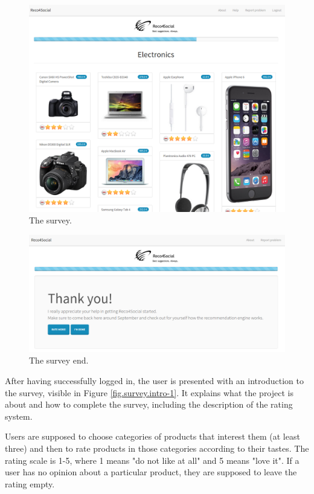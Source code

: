 \documentclass[12pt]{report}
\begin{document}
\begin{figure}[!t]
\centering
\includegraphics[width=\textwidth]{survey2.png} 
\caption[The survey.]{The survey.}
\label{fig.survey}
\end{figure}

\begin{figure}[!t]
\centering
\includegraphics[width=\textwidth]{survey_end.png} 
\caption[The survey end.]{The survey end.}
\label{fig.survey.end}
\end{figure}

After having successfully logged in, the user is presented with an introduction to the survey, visible in Figure \ref{fig.survey.intro-1}. It explains what the project is about and how to complete the survey, including the description of the rating system.

Users are supposed to choose categories of products that interest them (at least three) and then to rate products in those categories according to their tastes. The rating scale is 1-5, where 1 means "do not like at all" and 5 means "love it". If a user has no opinion about a particular product, they are supposed to leave the rating empty.
\end{document}

